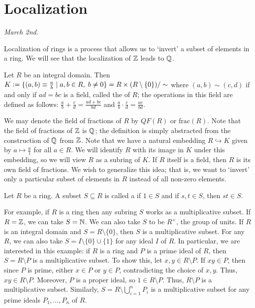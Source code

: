 \section{Localization}
\textit{March 2nd.}

Localization of rings is a process that allows us to `invert' a subset of elements in a ring. We will see that the localization of $\mathbb{Z}$ leads to $\mathbb{Q}$.

\begin{definition}
    Let $R$ be an integral domain. Then $K \vcentcolon= \{(a,b) \equiv \frac{a}{b} \mid a,b \in R, \; b \neq 0\} = R \times (R\setminus\{0\}) /\sim$ where $(a,b) \sim (c,d)$ if and only if $ad = bc$ is a field, called the  of $R$; the operations in this field are defined as follows: $\frac{a}{b} + \frac{c}{d} = \frac{ad + bc}{bd}$ and $\frac{a}{b} \cdot \frac{c}{d} = \frac{ac}{bd}$.
\end{definition}
We may denote the field of fractions of $R$ by $QF(R)$ or $\mathrm{frac}(R)$. Note that the field of fractions of $\mathbb{Z}$ is $\mathbb{Q}$; the definition is simply abstracted from the construction of $\mathbb{Q}$ from $\mathbb{Z}$. Note that we have a natural embedding $R \hookrightarrow K$ given by $a \mapsto \frac{a}{1}$ for all $a \in R$. We will identify $R$ with its image in $K$ under this embedding, so we will view $R$ as a subring of $K$. If $R$ itself is a field, then $R$ is its own field of fractions. We wish to generalize this idea; that is, we want to `invert' only a particular subset of elements in $R$ instead of all non-zero elements. 

\begin{definition}
    Let $R$ be a ring. A subset $S \subseteq R$ is called a  if $1 \in S$ and if $s,t \in S$, then $st \in S$.
\end{definition}

For example, if $R$ is a ring then any subring $S$ works as a multiplicative subset. If $R = \mathbb{Z}$, we can take $S = \mathbb{N}$. We can also take $S$ to be $R^{\times}$, the group of units. If $R$ is an integral domain and $S = R\setminus\{0\}$, then $S$ is a multiplicative subset. For any $R$, we can also take $S = I \setminus \{0\} \cup \{1\}$ for any ideal $I$ of $R$. In particular, we are interested in this example: if $R$ is a ring and $P$ is a prime ideal of $R$, then $S = R\setminus P$ is a multiplicative subset. To show this, let $x,y \in R\setminus P$. If $xy \in P$, then since $P$ is prime, either $x \in P$ or $y \in P$, contradicting the choice of $x,y$. Thus, $xy \in R\setminus P$. Moreover, $P$ is a proper ideal, so $1 \in R\setminus P$. Thus, $R\setminus P$ is a multiplicative subset. Similarly, $S = R\setminus \bigcup_{i=1}^{n} P_{i}$ is a multiplicative subset for any prime ideals $P_{1},\ldots,P_{n}$ of $R$.

